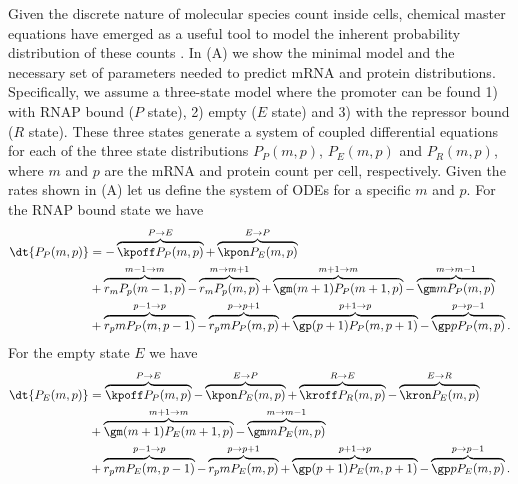 Given the discrete nature of molecular species count inside cells, chemical
master equations have emerged as a useful tool to model the inherent probability
distribution of these counts \cite{Sanchez2013}. In (A)
we show the minimal model and the necessary set of parameters needed to predict
mRNA and protein distributions. Specifically, we assume a three-state model
where the promoter can be found 1) with RNAP bound ($P$ state), 2) empty ($E$
state) and 3) with the repressor bound ($R$ state). These three states generate
a system of coupled differential equations for each of the three state
distributions $P_P(m, p)$, $P_E(m, p)$ and $P_R(m, p)$, where $m$ and $p$ are
the mRNA and protein count per cell, respectively. Given the rates shown in
(A) let us define the system of ODEs for a specific $m$
and $p$. For the RNAP bound state we have
\begin{equation}
  \begin{aligned}
    \dt{P_P(m, p)} &=
    - \overbrace{\kpoff P_P(m, p)}^{P \rightarrow E} %
    + \overbrace{\kpon P_E(m, p)}^{E \rightarrow P}\\ %
    &+ \overbrace{r_m P_p(m-1, p)}^{m-1 \rightarrow m} %
    - \overbrace{r_m P_p(m, p)}^{m \rightarrow m+1}%
    + \overbrace{\gm (m + 1) P_P(m+1 , p)}^{m+1 \rightarrow m} %
    - \overbrace{\gm m P_P(m , p)}^{m \rightarrow m-1}\\ %
    &+ \overbrace{r_p m P_P(m, p - 1)}^{p-1 \rightarrow p} %
    - \overbrace{r_p m P_P(m, p)}^{p \rightarrow p+1} %
    + \overbrace{\gp (p + 1) P_P(m, p + 1)}^{p + 1 \rightarrow p} %
    - \overbrace{\gp p P_P(m, p)}^{p \rightarrow p-1}. %
  \end{aligned}
\end{equation}
For the empty state $E$ we have
\begin{equation}
  \begin{aligned}
    \dt{P_E(m, p)} &=
    \overbrace{\kpoff P_P(m, p)}^{P \rightarrow E} %
    - \overbrace{\kpon P_E(m, p)}^{E \rightarrow P} %
    + \overbrace{\kroff P_R(m, p)}^{R \rightarrow E} %
    - \overbrace{\kron P_E(m, p)}^{E \rightarrow R}\\ %
    &+ \overbrace{\gm (m + 1) P_E(m+1 , p)}^{m+1 \rightarrow m} %
    - \overbrace{\gm m P_E(m , p)}^{m \rightarrow m-1}\\ %
    &+ \overbrace{r_p m P_E(m, p - 1)}^{p-1 \rightarrow p} %
    - \overbrace{r_p m P_E(m, p)}^{p \rightarrow p+1} %
    + \overbrace{\gp (p + 1) P_E(m, p + 1)}^{p + 1 \rightarrow p} %
    - \overbrace{\gp p P_E(m, p)}^{p \rightarrow p-1}. %
  \end{aligned}
\end{equation}
